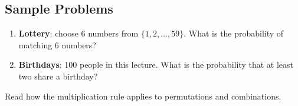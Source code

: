 \subsection{Sample Problems}

\begin{enumerate}[1)]
    \item \textbf{Lottery}: choose 6 numbers from $\{1,2,\dots,59\}$. What is the probability of matching 6 numbers?
    
    \item \textbf{Birthdays}: 100 people in this lecture. What is the probability that at least two share a birthday?
\end{enumerate}

\begin{note}
		{Read how the multiplication rule applies to permutations and combinations.}
\end{note}
